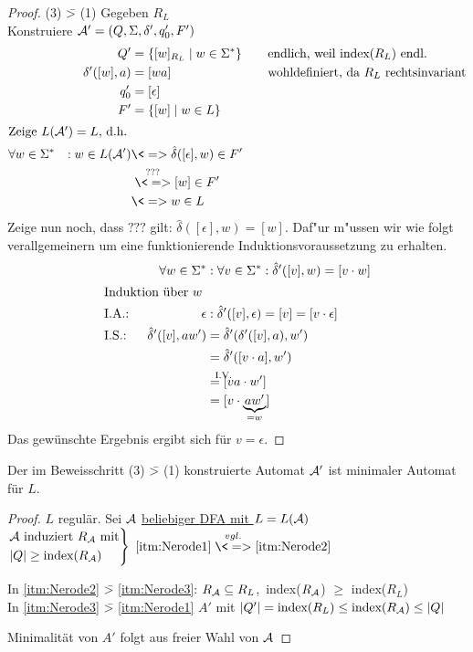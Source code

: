 \begin{proof}
    (3) \=> (1) Gegeben $R_L$\\
		Konstruiere $\mathcal{A}'=(Q,\Sigma,\delta',q_0',F')$
		\begin{alignat*}{3}
			&&Q' &= \{ [w]_{R_L} \mid w\in \Sigma^* \} &\quad& \text{endlich, weil index($R_L$) endl.}\\
			&&\delta'([w],a) &= [wa] && \text{wohldefiniert, da $R_L$ rechtsinvariant}\\
			&&q_0' &= [\epsilon]\\
			&&F' &= \{ [w] \mid w\in L \}\\
			\shortintertext{Zeige $L(\A')=L$, d.h. }
			&\forall w\in \Sigma^* &: w\in L(\A') &\<=> \hat\delta([\epsilon],w)\in F'\\
			&&&\overset{???}{\<=>} [w]\in F' \\
			&&&\<=> w\in L
		\end{alignat*}
		Zeige nun noch, dass $???$ gilt: $\hat\delta([\epsilon], w) = [w]$. 
		Daf"ur m"ussen wir wie folgt verallgemeinern um eine funktionierende Induktionsvoraussetzung zu erhalten.
		\begin{alignat*}{3}
			&&\forall w\in\Sigma^* &:
			\forall v\in\Sigma^* : \hat\delta'([v],w) = [v\cdot w]\\
			\shortintertext{Induktion über $w$}
			&\text{I.A.: }& \epsilon &: \hat\delta'([v],\epsilon) = [v]=[v\cdot\epsilon]\\
			&\text{I.S.: }& \hat\delta'([v],aw') &= \hat\delta'(\delta'([v],a),w')\\
			&&&= \hat\delta'([v\cdot a],w')\\
			&&&\overset{\mathrlap{\text{I.V.}}}{=} [va\cdot w']\\
			&&&= [v\cdot \underbrace{aw'}_{=w}]
		\end{alignat*}
		Das gewünschte Ergebnis  ergibt sich für $v=\epsilon$. \qedhere
\end{proof}
%
\setcounter{Korollar}{4}
\begin{Korollar}
	Der im Beweisschritt (3) \=> (1) konstruierte Automat $\mathcal{A}'$ ist minimaler Automat für $L$.
\end{Korollar}
\begin{proof}
	$L$ regulär. Sei $\mathcal{A}$ \underline{beliebiger \ac{DFA} mit $L=L(\mathcal{A})$}\\
	$\begin{rcases}
	\mathcal{A}\text{ induziert }R_{\mathcal{A}}\text{ mit}\\
	|Q|\geq\text{index}(R_{\mathcal{A}})
	\end{rcases}$ $\ref{itm:Nerode1} \overset{vgl.}{\<=>} \ref{itm:Nerode2}$
	
	In \ref{itm:Nerode2} \=> \ref{itm:Nerode3}: $R_{\mathcal{A}}\subseteq R_L$,\ index($R_{\mathcal{A}}$) $\geq$ index($R_L$)\\
	In \ref{itm:Nerode3} \=> \ref{itm:Nerode1} $A'$ mit $|Q'|=\text{index}(R_L) \leq \text{index}(R_{\mathcal{A}})\leq |Q|$
	
	Minimalität von $A'$ folgt aus freier Wahl von $\mathcal{A}$
\end{proof}

